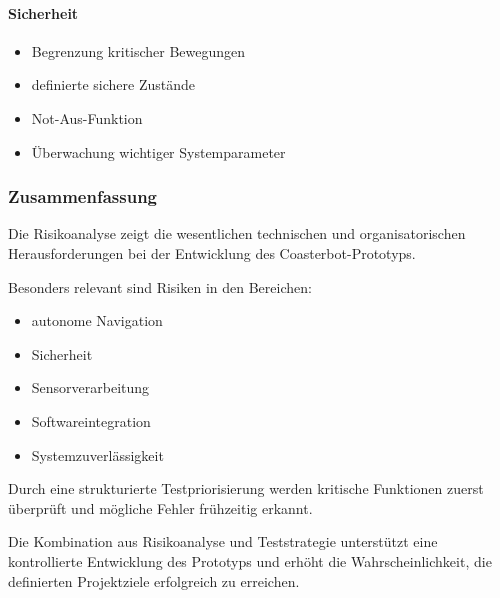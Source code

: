 \documentclass[
  a4paper,
  12pt,
  DIV=12,        %
  parskip=half,  %
  headings=small %
]{scrartcl}
\theoremstyle{definition}
\providecommand{\tightlist}{%
  \setlength{\itemsep}{0pt}\setlength{\parskip}{0pt}}
\theoremstyle{definition}
\begin{document}
\paragraph{Sicherheit}\label{sicherheit}

\begin{itemize}
\tightlist
\item
  Begrenzung kritischer Bewegungen
\item
  definierte sichere Zustände
\item
  Not-Aus-Funktion
\item
  Überwachung wichtiger Systemparameter
\end{itemize}

\subsubsection{Zusammenfassung}\label{zusammenfassung-7}

Die Risikoanalyse zeigt die wesentlichen technischen und
organisatorischen Herausforderungen bei der Entwicklung des
Coasterbot-Prototyps.

Besonders relevant sind Risiken in den Bereichen:

\begin{itemize}
\tightlist
\item
  autonome Navigation
\item
  Sicherheit
\item
  Sensorverarbeitung
\item
  Softwareintegration
\item
  Systemzuverlässigkeit
\end{itemize}

Durch eine strukturierte Testpriorisierung werden kritische Funktionen
zuerst überprüft und mögliche Fehler frühzeitig erkannt.

Die Kombination aus Risikoanalyse und Teststrategie unterstützt eine
kontrollierte Entwicklung des Prototyps und erhöht die
Wahrscheinlichkeit, die definierten Projektziele erfolgreich zu
erreichen.
\end{document}
